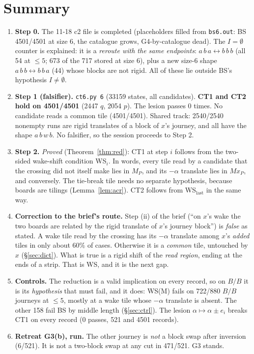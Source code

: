 \documentclass[11pt]{article}
\theoremstyle{definition}\newtheorem{definition}[theorem]{Definition}\newtheorem{remark}[theorem]{Remark}
\begin{document}
\section*{Summary}
\begin{enumerate}
\item \textbf{Step 0.} The 11-18 c2 file is completed (placeholders filled from \texttt{bs6.out}: BS 4501/4501 at size 6, the catalogue grows, G4-by-catalogue dead). The $I=\emptyset$ counter is explained: it is a \emph{reroute with the same endpoints}: $a\,b\,a\leftrightarrow b\,b\,b$ (all 54 at $\le5$; 673 of the 717 stored at size 6), plus a new size-6 shape $a\,b\,b\leftrightarrow b\,b\,a$ (44) whose blocks are not rigid. All of these lie outside BS's hypothesis $I\neq\emptyset$.
\item \textbf{Step 1 (falsifier).} \texttt{ct6.py 6} (33159 states, all candidates). \textbf{CT1 and CT2 hold on 4501/4501} (2447 $q$, 2054 $p$). The lesion passes 0 times. No candidate reads a common tile (4501/4501).
Shared track: 2540/2540 nonempty runs are rigid translates of a block of $x$'s journey, and all have the shape $a\,b\,w\,b$. No falsifier, so the session proceeds to Step 2.
\item \textbf{Step 2.} \emph{Proved} (Theorem~\ref{thm:red}): CT1 at step $i$ follows from the two-sided wake-shift condition WS$_i$. In words, every tile read by a candidate that the crossing did not itself make lies in $M_P$, and its $-\alpha$ translate lies in $Mx_P$, and conversely. The tie-break tile needs no separate hypothesis, because boards are tilings (Lemma~\ref{lem:acr}). CT2 follows from WS$_\mathrm{last}$ in the same way.
\item \textbf{Correction to the brief's route.} Step (ii) of the brief (``on $x$'s wake the two boards are related by the rigid translate of $x$'s journey block'') is \emph{false} as stated.
A wake tile read by the crossing has its $-\alpha$ translate among $x$'s \emph{added} tiles in only about 60\% of cases. Otherwise it is a \emph{common} tile, untouched by $x$ (\S\ref{sec:dict}).
What is true is a rigid shift of the \emph{read region}, ending at the ends of a strip. That is WS, and it is the next gap.
\item \textbf{Controls.} The reduction is a valid implication on every record, so on $B/B$ it is its \emph{hypothesis} that must fail, and it does: WS(M) fails on 722/880 $B/B$ journeys at $\le5$, mostly at a wake tile whose $-\alpha$ translate is absent. The other 158 fail BS by middle length (\S\ref{sec:ctrl}). The lesion $\alpha\mapsto\alpha\pm e_i$ breaks CT1 on every record (0 passes, 521 and 4501 records).
\item \textbf{Retreat G3(b), run.} The other journey is \emph{not} a block swap after inversion (6/521). It is not a two-block swap at any cut in 471/521. G3 stands.
\end{enumerate}
\end{document}
